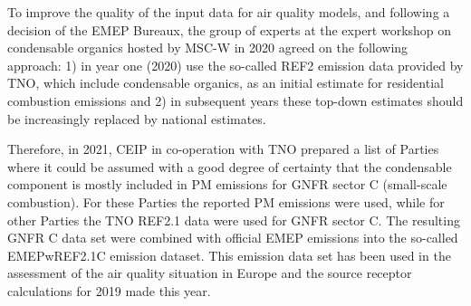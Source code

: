 To improve the quality of the input data for air quality models, and following a decision of the EMEP Bureaux, the group of experts at the expert workshop on condensable organics hosted by MSC-W in 2020 agreed on the following approach: 1) in year one (2020) use the so-called REF2 emission data provided by TNO, which include condensable organics, as an initial estimate for residential combustion emissions and 2) in subsequent years these top-down estimates should be increasingly replaced by national estimates. 

Therefore, in 2021, CEIP in co-operation with TNO prepared a list of Parties where it could be assumed with a good degree of certainty that the condensable component is mostly included in PM emissions for GNFR sector C (small-scale combustion). For these Parties the reported PM emissions were used, while for other Parties the TNO REF2.1 data were used for GNFR sector C. The resulting GNFR C data set were combined with official EMEP emissions into the so-called EMEPwREF2.1C emission dataset. This emission data set has been used in the assessment of the air quality situation in Europe and the source receptor calculations for 2019 made this year. 



